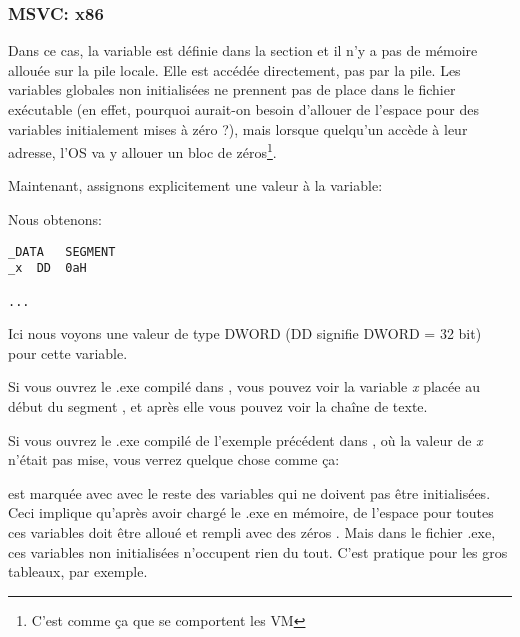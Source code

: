 \subsubsection{MSVC: x86}



Dans ce cas, la variable  est définie dans la section  et il n'y
a pas de mémoire allouée sur la pile locale. Elle est accédée directement, pas par
la pile.
Les variables globales non initialisées ne prennent pas de place dans le fichier
exécutable (en effet, pourquoi aurait-on besoin d'allouer de l'espace pour des variables
initialement mises à zéro ?), mais lorsque quelqu'un accède à leur adresse, l'\ac{OS}
va y allouer un bloc de zéros\footnote{C'est comme ça que se comportent les \ac{VM}}.

Maintenant, assignons explicitement une valeur à la variable:



Nous obtenons:

\begin{lstlisting}[style=customasmx86]
_DATA	SEGMENT
_x	DD	0aH

...
\end{lstlisting}

Ici nous voyons une valeur  de type DWORD (DD signifie DWORD = 32 bit) pour
cette variable.

Si vous ouvrez le .exe compilé dans \IDA, vous pouvez voir la variable \emph{x} placée
au début du segment , et après elle vous pouvez voir la chaîne de texte.

Si vous ouvrez le .exe compilé de l'exemple précédent dans \IDA, où la valeur de
\emph{x} n'était pas mise, vous verrez quelque chose comme ça:



\label{BSSClearedByCStd}
 est marquée avec  avec le reste des variables qui ne doivent pas être
initialisées.
Ceci implique qu'après avoir chargé le .exe en mémoire, de l'espace pour toutes ces
variables doit être alloué et rempli avec des zéros .
Mais dans le fichier .exe, ces variables non initialisées n'occupent rien du tout.
C'est pratique pour les gros tableaux, par exemple.



